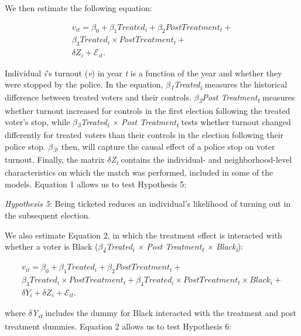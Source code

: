 \documentclass[
  12pt,
]{article}
\begin{document}
We then estimate the following equation:

\begin{gather}
\label{eq:1}
v_{it}=\beta_0+\beta_1Treated_{i}+\beta_2Post Treatment_{t} + \nonumber \\
\beta_3Treated_{i}\times Post Treatment_{t} + \\
\delta{Z}_{i} + \mathcal{E}_{it}. \nonumber
\end{gather}

Individual \emph{i}'s turnout (\emph{v}) in year \emph{t} is a function of the year and whether they were stopped by the police. In the equation, \emph{\(\beta\)\textsubscript{1}Treated\textsubscript{i}} measures the historical difference between treated voters and their controls. \emph{\(\beta\)\textsubscript{2}Post Treatment\textsubscript{t}} measures whether turnout increased for controls in the first election following the treated voter's stop, while \emph{\(\beta\)\textsubscript{3}Treated\textsubscript{i} × Post Treatment\textsubscript{t}} tests whether turnout changed differently for treated voters than their controls in the election following their police stop. \emph{\(\beta\)\textsubscript{3}}, then, will capture the causal effect of a police stop on voter turnout. Finally, the matrix \emph{\(\delta\)Z\textsubscript{i}} contains the individual- and neighborhood-level characteristics on which the match was performed, included in some of the models. Equation 1 allows us to test Hypothesis 5:

\emph{Hypothesis 5}: Being ticketed reduces an individual's likelihood of turning out in the subsequent election.

We also estimate Equation 2, in which the treatment effect is interacted with whether a voter is Black (\emph{\(\beta\)\textsubscript{4}Treated\textsubscript{i} × Post Treatment\textsubscript{t} × Black\textsubscript{i}}):

\begin{gather}
\label{eq:2}
v_{it}=\beta_0+\beta_1Treated_{i}+\beta_2Post Treatment_{t} + \nonumber \\
\beta_3Treated_{i}\times Post Treatment_{t} + \beta_4Treated_{i}\times Post Treatment_{t}\times Black_{i} +\\
\delta{Y}_{i} + \delta{Z}_{i} + \mathcal{E}_{it}. \nonumber
\end{gather}

where \emph{\(\delta\)Y\textsubscript{it}} includes the dummy for Black interacted with the treatment and post treatment dummies. Equation 2 allows us to test Hypothesis 6:
\end{document}
